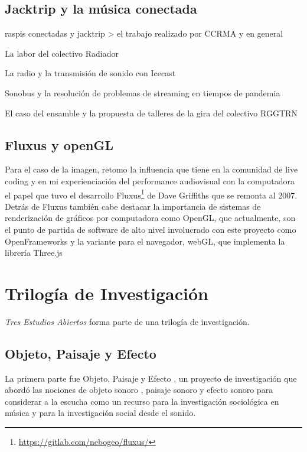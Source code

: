 \subsection{Jacktrip y la música conectada}

raspis conectadas y jacktrip > el trabajo realizado por CCRMA y en general 

La labor del colectivo Radiador

La radio y la transmisión de sonido con Icecast 

Sonobus y la resolución de problemas de streaming en tiempos de pandemia

El caso del ensamble y la propuesta de talleres de la gira del colectivo RGGTRN 

\subsection{Fluxus y openGL}

Para el caso de la imagen, retomo la influencia que tiene en la comunidad de live coding y en mi experienciación del performance audiovisual con la computadora el papel que tuvo el desarrollo Fluxus\footnote{\url{https://gitlab.com/nebogeo/fluxus/}} de Dave Griffiths que se remonta al 2007. Detrás de Fluxus también cabe destacar la importancia de sistemas de renderización de gráficos por computadora como OpenGL, que actualmente, son el punto de partida de software de alto nivel involucrado con este proyecto como OpenFrameworks y la variante para el navegador, webGL, que implementa la librería Three.js 



\section{Trilogía de Investigación}

\textit{Tres Estudios Abiertos} forma parte de una trilogía de investigación.

\subsection{Objeto, Paisaje y Efecto}

La primera parte fue Objeto, Paisaje y Efecto \citep{ocelotlLic}, un proyecto de investigación que abordó las nociones de objeto sonoro \citep{schaeffer}, paisaje sonoro\citep{schafer1} y efecto sonoro \citep{augoyard} para considerar a la escucha como un recurso para la investigación sociológica en música y para la investigación social desde el sonido.

